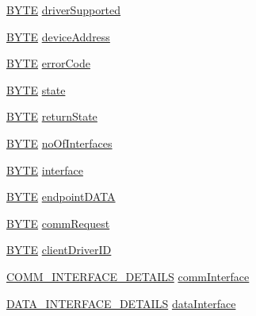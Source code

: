 \begin{DoxyCompactItemize}
\begin{tabbing}
\end{tabbing}\item 
\hyperlink{_generic_type_defs_8h_a4ae1dab0fb4b072a66584546209e7d58}{B\+Y\+T\+E} \hyperlink{struct___u_s_b___c_d_c___d_e_v_i_c_e___i_n_f_o_a4b1e154be3e32ff64a9897b950bfad72}{driver\+Supported}
\item 
\hyperlink{_generic_type_defs_8h_a4ae1dab0fb4b072a66584546209e7d58}{B\+Y\+T\+E} \hyperlink{struct___u_s_b___c_d_c___d_e_v_i_c_e___i_n_f_o_aa1d659071a17ee8d0172d34d6783b517}{device\+Address}
\item 
\hyperlink{_generic_type_defs_8h_a4ae1dab0fb4b072a66584546209e7d58}{B\+Y\+T\+E} \hyperlink{struct___u_s_b___c_d_c___d_e_v_i_c_e___i_n_f_o_aeed843858495988cfbec7df4f05862cb}{error\+Code}
\item 
\hyperlink{_generic_type_defs_8h_a4ae1dab0fb4b072a66584546209e7d58}{B\+Y\+T\+E} \hyperlink{struct___u_s_b___c_d_c___d_e_v_i_c_e___i_n_f_o_ae0cccc3e8e24fd8bc52a62b331c9b9e4}{state}
\item 
\hyperlink{_generic_type_defs_8h_a4ae1dab0fb4b072a66584546209e7d58}{B\+Y\+T\+E} \hyperlink{struct___u_s_b___c_d_c___d_e_v_i_c_e___i_n_f_o_aea3abadeea0eff004cdfa31781557074}{return\+State}
\item 
\hyperlink{_generic_type_defs_8h_a4ae1dab0fb4b072a66584546209e7d58}{B\+Y\+T\+E} \hyperlink{struct___u_s_b___c_d_c___d_e_v_i_c_e___i_n_f_o_a9b890021112a620d72e687deae73d4c1}{no\+Of\+Interfaces}
\item 
\hyperlink{_generic_type_defs_8h_a4ae1dab0fb4b072a66584546209e7d58}{B\+Y\+T\+E} \hyperlink{struct___u_s_b___c_d_c___d_e_v_i_c_e___i_n_f_o_a6e65d646f7737013c8389976f1e27806}{interface}
\item 
\hyperlink{_generic_type_defs_8h_a4ae1dab0fb4b072a66584546209e7d58}{B\+Y\+T\+E} \hyperlink{struct___u_s_b___c_d_c___d_e_v_i_c_e___i_n_f_o_a3aa356dc9da45bcfe8ae9f459ea1a69a}{endpoint\+D\+A\+T\+A}
\item 
\hyperlink{_generic_type_defs_8h_a4ae1dab0fb4b072a66584546209e7d58}{B\+Y\+T\+E} \hyperlink{struct___u_s_b___c_d_c___d_e_v_i_c_e___i_n_f_o_a9c596b4899fb8e55a519bc6ce2b67b00}{comm\+Request}
\item 
\hyperlink{_generic_type_defs_8h_a4ae1dab0fb4b072a66584546209e7d58}{B\+Y\+T\+E} \hyperlink{struct___u_s_b___c_d_c___d_e_v_i_c_e___i_n_f_o_a343912ad63712ea60903f5acd92efc9e}{client\+Driver\+I\+D}
\item 
\hyperlink{usb__host__cdc_8h_abf420497d92c40c2e203b8efce488ca1}{C\+O\+M\+M\+\_\+\+I\+N\+T\+E\+R\+F\+A\+C\+E\+\_\+\+D\+E\+T\+A\+I\+L\+S} \hyperlink{struct___u_s_b___c_d_c___d_e_v_i_c_e___i_n_f_o_a60ad1d8e9f96002de357cfdcc01db2da}{comm\+Interface}
\item 
\hyperlink{usb__host__cdc_8h_a0b9bd66fd9a1433480b5d4d0bc1a28b8}{D\+A\+T\+A\+\_\+\+I\+N\+T\+E\+R\+F\+A\+C\+E\+\_\+\+D\+E\+T\+A\+I\+L\+S} \hyperlink{struct___u_s_b___c_d_c___d_e_v_i_c_e___i_n_f_o_a1b2c2e918a0ec7537489645e5bc583a9}{data\+Interface}
\end{DoxyCompactItemize}


